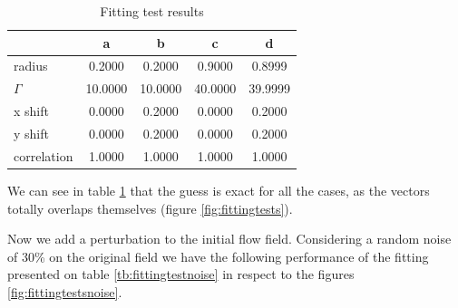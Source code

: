 \documentclass[12pt, a4paper, openany]{memoir}
\begin{document}
\begin{table}[h]
	\centering
	\caption{Fitting test results}
	\vspace{10px}
	\label{tb:fittingtest}
	\begin{tabular}{l|c|c|c|c}
		            & a      & b & c & d \\
		\hline
		radius      & 0.2000   & 0.2000 & 0.9000 & 0.8999  \\
		$\Gamma$       & 10.0000 & 10.0000 & 40.0000 & 39.9999 \\
		x shift     & 0.0000  & 0.2000 & 0.0000 & 0.2000 \\
		y shift     & 0.0000  & 0.2000 & 0.0000 & 0.2000 \\ 
		correlation & 1.0000   & 1.0000 & 1.0000 & 1.0000 \\
	\end{tabular}
\end{table}

We can see in table \ref{tb:fittingtest} that the guess is exact for all the cases, as the vectors totally overlaps themselves (figure \ref{fig:fittingtests}).

Now we add a perturbation to the initial flow field. Considering a random noise of 30\% on the original field we have the following performance of the fitting presented on table \ref{tb:fittingtestnoise} in respect to the figures \ref{fig:fittingtestsnoise}.
\end{document}
